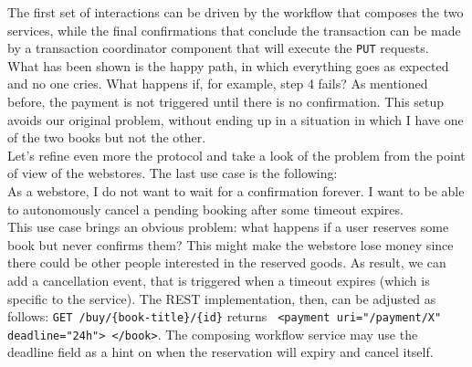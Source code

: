 The first set of interactions can be driven by the workflow that composes the two services, while the final confirmations that conclude the transaction can be made by a transaction coordinator component that will execute the {\tt PUT} requests.\\
What has been shown is the happy path, in which everything goes as expected and no one cries. What happens if, for example, step 4 fails? As mentioned before, the payment is not triggered until there is no confirmation. This setup avoids our original problem, without ending up in a situation in which I have one of the two books but not the other.\\
Let's refine even more the protocol and take a look of the problem from the point of view of the webstores. The last use case is the following:\\
As a webstore, I do not want to wait for a confirmation forever. I want to be able to autonomously cancel a pending booking after some timeout expires.\\
This use case brings an obvious problem: what happens if a user reserves some book but never confirms them? This might make the webstore lose money since there could be other people interested in the reserved goods. As result, we can add a cancellation event, that is triggered when a timeout expires (which is specific to the service). The REST implementation, then, can be adjusted as follows: {\tt GET /buy/\{book-title\}/\{id\}} returns {\tt <book title id> <payment uri="/payment/X" deadline="24h"> </book>}. The composing workflow service may use the deadline field as a hint on when the reservation will expiry and cancel itself.


